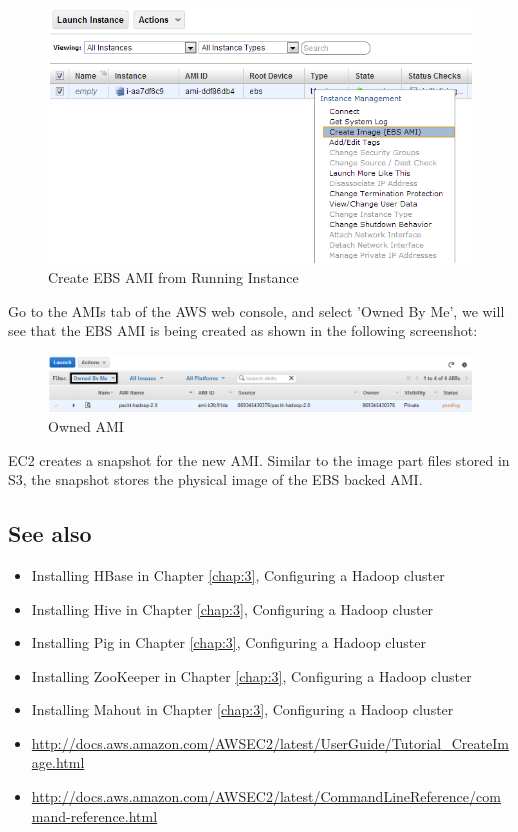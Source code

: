 \begin{figure}[ht]
  \centering
  \includegraphics[width=.8\textwidth]{figs/5163os_08_31.png}
  \caption{Create EBS AMI from Running Instance}\label{fig:aws.create.ebsami}
\end{figure} 
Go to the AMIs tab of the AWS web console, and select 'Owned By Me', we will see that the EBS AMI is being created as shown in the following screenshot:
\begin{figure}[ht]
  \centering
  \includegraphics[width=.8\textwidth]{figs/5163os_08_33.png}
  \caption{Owned AMI}\label{fig:aws.owned.ami}
\end{figure} 
EC2 creates a snapshot for the new AMI. Similar to the image part files stored in S3, the snapshot stores the physical image of the EBS backed AMI.

\subsection*{See also}
\begin{itemize}
  \item Installing HBase in Chapter \ref{chap:3}, Configuring a Hadoop cluster
  \item Installing Hive in Chapter \ref{chap:3}, Configuring a Hadoop cluster
  \item Installing Pig in Chapter \ref{chap:3}, Configuring a Hadoop cluster
  \item Installing ZooKeeper in Chapter \ref{chap:3}, Configuring a Hadoop cluster
  \item Installing Mahout in Chapter \ref{chap:3}, Configuring a Hadoop cluster
  \item \url{http://docs.aws.amazon.com/AWSEC2/latest/UserGuide/Tutorial_CreateImage.html}
  \item \url{http://docs.aws.amazon.com/AWSEC2/latest/CommandLineReference/command-reference.html}
\end{itemize}

